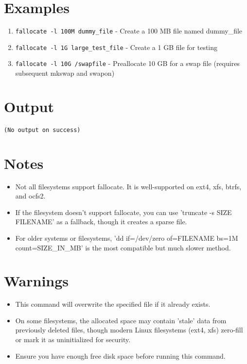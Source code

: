 \documentclass{article}
\begin{document}
\section*{Examples}
\begin{enumerate}
  \item \texttt{fallocate -l 100M dummy\_file} - Create a 100 MB file named dummy\_file
  \item \texttt{fallocate -l 1G large\_test\_file} - Create a 1 GB file for testing
  \item \texttt{fallocate -l 10G /swapfile} - Preallocate 10 GB for a swap file (requires subsequent mkswap and swapon)
\end{enumerate}

\section*{Output}
\begin{lstlisting}
(No output on success)
\end{lstlisting}

\section*{Notes}
\begin{itemize}
  \item Not all filesystems support fallocate. It is well-supported on ext4, xfs, btrfs, and ocfs2.
  \item If the filesystem doesn't support fallocate, you can use 'truncate -s SIZE FILENAME' as a fallback, though it creates a sparse file.
  \item For older systems or filesystems, 'dd if=/dev/zero of=FILENAME bs=1M count=SIZE\_IN\_MB' is the most compatible but much slower method.
\end{itemize}

\section*{Warnings}
\begin{itemize}
  \item This command will overwrite the specified file if it already exists.
  \item On some filesystems, the allocated space may contain 'stale' data from previously deleted files, though modern Linux filesystems (ext4, xfs) zero-fill or mark it as uninitialized for security.
  \item Ensure you have enough free disk space before running this command.
\end{itemize}
\end{document}
